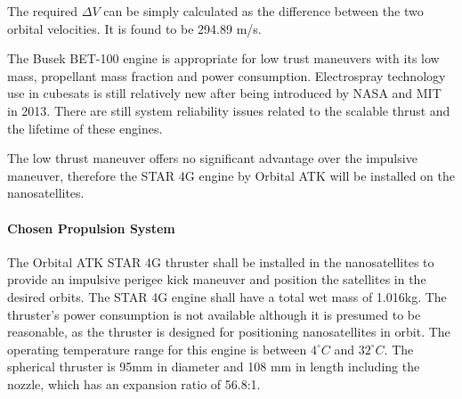 The required $\Delta V$ can be simply calculated as the difference between the two orbital velocities. It is found to be 294.89 m/s.

The Busek BET-100 engine is appropriate for low trust maneuvers with its low mass, propellant mass fraction and power consumption. Electrospray technology use in cubesats is still relatively new after being introduced by NASA and MIT in 2013. There are still system reliability issues related to the scalable thrust and the lifetime of these engines.

The low thrust maneuver offers no significant advantage over the impulsive maneuver, therefore the STAR 4G engine by Orbital ATK will be installed on the nanosatellites.

\paragraph{Chosen Propulsion System}
The Orbital ATK STAR 4G thruster shall be installed in the nanosatellites to provide an impulsive perigee kick maneuver and position the satellites in the desired orbits. The STAR 4G engine shall have a total wet mass of 1.016kg. The thruster's power consumption is not available although it is presumed to be reasonable, as the thruster is designed for positioning nanosatellites in orbit. The operating temperature range for this engine is between $4^\circ C$ and $32^\circ C$. The spherical thruster is 95mm in diameter and 108 mm in length including the nozzle, which has an expansion ratio of 56.8:1.
